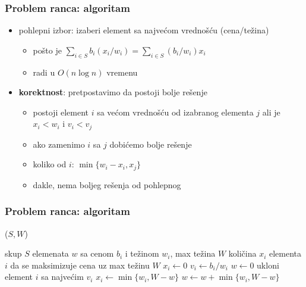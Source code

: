 \documentclass[compress]{beamer}
\begin{document}
\begin{frame}[fragile]
  \frametitle{Problem ranca: algoritam}
  \begin{itemize}
    \item pohlepni izbor: izaberi element sa najvećom vrednošću (cena/težina)
    \begin{itemize}
      \item pošto je $\sum_{i\in S}b_{i}(x_{i}/w_{i}) = \sum_{i\in S}(b_{i}/w_{i})x_{i}$
      \item radi u $O(n\log n)$ vremenu
    \end{itemize}
    \item \textbf{korektnost}: pretpostavimo da postoji bolje rešenje
    \begin{itemize}
      \item postoji element $i$ sa većom vrednošću od izabranog elementa 
      $j$ ali je $x_{i}<w_{i}$ i $v_{i}<v_{j}$
      \item ako zamenimo $i$ sa $j$ dobićemo bolje rešenje
      \item koliko od $i$: $\min\{w_{i}-x_{i},x_{j}\}$
      \item dakle, nema boljeg rešenja od pohlepnog
    \end{itemize}
  \end{itemize}
\end{frame}

\begin{frame}
  \frametitle{Problem ranca: algoritam}
  ($S, W$)
  \begin{algorithmic}
    \REQUIRE skup $S$ elemenata $w$ sa cenom $b_{i}$ i težinom $w_{i}$, max težina $W$
    \ENSURE količina $x_{i}$ elementa $i$ da se maksimizuje cena uz max težinu $W$
      \STATE $x_{i} \leftarrow 0$
      \STATE $v_{i} \leftarrow b_{i} / w_{i}$ 
    \ENDFOR
    \STATE $w \leftarrow 0$ 
      \STATE ukloni element $i$ sa najvećim $v_{i}$
      \STATE $x_{i} \leftarrow \min\{w_{i}, W-w\}$
      \STATE $w \leftarrow w + \min\{w_{i}, W-w\}$ 
    \ENDWHILE
  \end{algorithmic}    
\end{frame}
\end{document}
